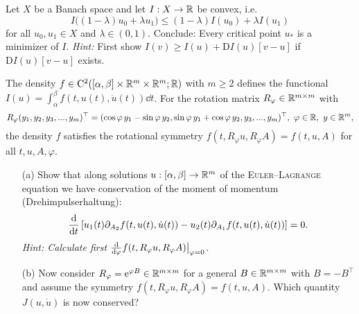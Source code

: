 \documentclass[12pt,a4paper]{article}
\begin{document}

\setcounter{AUFGABE}{6}

Let $X$ be a Banach space and let
$I:X\to{\mathbb R}$ be convex, i.e.
\[
I\big((1{-}\lambda)u_0 + \lambda u_1\big)\leq (1{-}\lambda)I(u_0)+ \lambda I(u_1)
\]
for all $u_0,u_1\in X$ and $\lambda\in(0,1)$.
Conclude: Every critical  point $u_\ast$ is a minimizer of $I$.
\textit{Hint:} First show 
$I(v)\geq I(u)+ \mathrm{D}I(u)[v{-}u]$
if $\mathrm{D}I(u)[v{-}u]$ exists.


 The
density $f\in {\mathrm C}^2([\alpha,\beta]\times{\mathbb R}^m\times{\mathbb R}^m;{\mathbb R})$ with
$m\geq 2$ defines
the functional  $I(u)=\int_{\alpha}^{\beta} f(t,u(t),\dot{u}(t))\dd t$.
For the rotation matrix  $R_{\varphi}\in{\mathbb R}^{m\times{}m}$ with 
\[
R_{\varphi}(y_1,y_2,y_3,...,y_m)^\top= ( \cos\varphi \,y_1 -\sin\varphi\, y_2,
\sin\varphi\, y_1 + \cos\varphi\, y_2,y_3,..., y_m)^\top, \  \varphi\in
{\mathbb R},\ y\in {\mathbb R}^m,
\]
the density $f$ satisfies the rotational symmetry 
$f(t,R_\varphi{}u,R_\varphi{}A)=f(t,u,A)$ for all $t,u,A,\varphi$.

\begin{itemize}
\item[(a)]  Show that along solutions  $u:[\alpha,\beta]\to{\mathbb R}^m$ of the
\textsc{Euler--Lagrange} equation we have conservation of the moment
of momentum (Drehimpulserhaltung):
\[
\frac{{\mathrm d} }{{\mathrm d} t} \left[ u_1(t)\partial_{A_2}f(t,u(t),\dot{u}(t)) - 
u_2(t)\partial_{A_1}f(t,u(t),\dot{u}(t))\right]= 0.
\]
\emph{Hint: Calculate first $\frac{{\mathrm d}}{{\mathrm d} \varphi} 
f(t,R_\varphi{}u,R_\varphi{}A)\big|_{\varphi=0}$.}


\item[(b)] Now consider $R_\varphi=\mathrm{e}^{\varphi{}B}\in{\mathbb R}^{m\times{}m}$ for a
  general $B\in{\mathbb R}^{m\times{}m}$ with $B=-B^\top$ and assume the
  symmetry 
$f(t,R_\varphi{}u,R_\varphi{}A)=f(t,u,A)$. Which quantity  $J(u,\dot{u})$
is now conserved?
\end{itemize}
\end{document}
